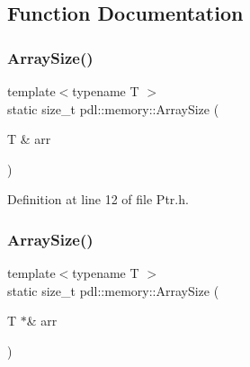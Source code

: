 \subsection{Function Documentation}
\mbox{\label{namespacepdl_1_1memory_a6b241543273dd10c22579216a915d8cd}} 
\subsubsection{\texorpdfstring{ArraySize()}{ArraySize()}\hspace{0.1cm}{\footnotesize\ttfamily [1/3]}}
{\footnotesize\ttfamily template$<$typename T $>$ \\
static size\+\_\+t pdl\+::memory\+::\+Array\+Size (\begin{DoxyParamCaption}\item[{T \&}]{arr }\end{DoxyParamCaption})\hspace{0.3cm}{\ttfamily [static]}}



Definition at line 12 of file Ptr.\+h.


\begin{DoxyCode}{0}

\end{DoxyCode}
\mbox{\label{namespacepdl_1_1memory_a5d2cd992c656e757990b2b81a40a818e}} 
\subsubsection{\texorpdfstring{ArraySize()}{ArraySize()}\hspace{0.1cm}{\footnotesize\ttfamily [2/3]}}
{\footnotesize\ttfamily template$<$typename T $>$ \\
static size\+\_\+t pdl\+::memory\+::\+Array\+Size (\begin{DoxyParamCaption}\item[{T $\ast$\&}]{arr }\end{DoxyParamCaption})\hspace{0.3cm}{\ttfamily [static]}}



